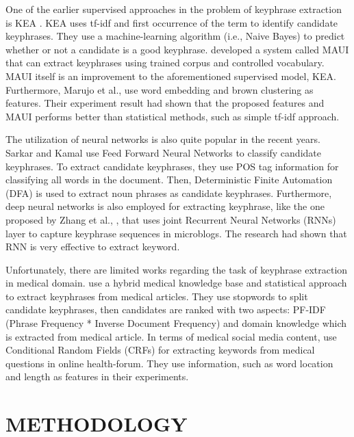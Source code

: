 One of the earlier supervised approaches in the problem of keyphrase extraction is KEA \cite{witten1999kea}. KEA uses tf-idf and first occurrence of the term to identify candidate keyphrases. They use a machine-learning algorithm (i.e., Naive Bayes) to predict whether or not a candidate is a good keyphrase. \cite{medelyan2009human} developed a system called MAUI that can extract keyphrases using trained corpus and controlled vocabulary. MAUI itself is an improvement to the aforementioned supervised model, KEA. Furthermore, Marujo et al., \cite{marujoMAUI} use word embedding and brown clustering as features. Their experiment result had shown that the proposed features and MAUI performs better than statistical methods, such as simple tf-idf approach.

The utilization of neural networks is also quite popular in the recent years. Sarkar and Kamal \cite{ekpNeuralNetworks} use Feed Forward Neural Networks to classify candidate keyphrases. To extract candidate keyphrases, they use POS tag information for classifying all words in the document. Then, Deterministic Finite Automation (DFA) is used to extract noun phrases as candidate keyphrases. Furthermore, deep neural networks is also employed for extracting keyphrase, like the one proposed by Zhang et al., \cite{zhang2016keyphrase}, that uses joint Recurrent Neural Networks (RNNs) layer to capture keyphrase sequences in microblogs. The research had shown that RNN is very effective to extract keyword.

Unfortunately, there are limited works regarding the task of keyphrase extraction in medical domain. \cite{ekpMedicalDocumentHybrid} use a hybrid medical knowledge base and statistical approach to extract keyphrases from medical articles. They use stopwords to split candidate keyphrases, then candidates are ranked with two aspects: PF-IDF (Phrase Frequency * Inverse Document Frequency) and domain knowledge which is extracted from medical article. In terms of medical social media content, \cite{cao2010automatically} use Conditional Random Fields (CRFs) for extracting keywords from medical questions in online health-forum. They use information, such as word location and length as features in their experiments.
\fi
\section{METHODOLOGY}

\iffalse
